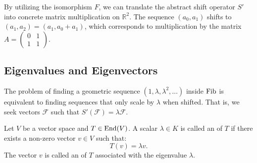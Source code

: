 By utilizing the isomorphism $F$, we can translate the abstract shift operator $S'$ into concrete matrix multiplication on $\mathbb{R}^2$. The sequence $(a_0, a_1)$ shifts to $(a_1, a_2) = (a_1, a_0 + a_1)$, which corresponds to multiplication by the matrix $A = \left(\begin{smallmatrix} 0 & 1 \\ 1 & 1 \end{smallmatrix}\right)$.

\begin{center}
\end{center}

\subsection{Eigenvalues and Eigenvectors}

The problem of finding a geometric sequence $(1, \lambda, \lambda^2, \dots)$ inside $\operatorname{Fib}$ is equivalent to finding sequences that only scale by $\lambda$ when shifted. That is, we seek vectors $\mathcal{F}$ such that $S'(\mathcal{F}) = \lambda \mathcal{F}$.

\begin{definition}
  \label{def:eigenvalue_motivation}
  Let $V$ be a vector space and $T \in \operatorname{End}(V)$. A scalar $\lambda \in K$ is called an  of $T$ if there exists a non-zero vector $v \in V$ such that:
  \[ T(v) = \lambda v. \]
  The vector $v$ is called an  of $T$ associated with the eigenvalue $\lambda$.
\end{definition}


